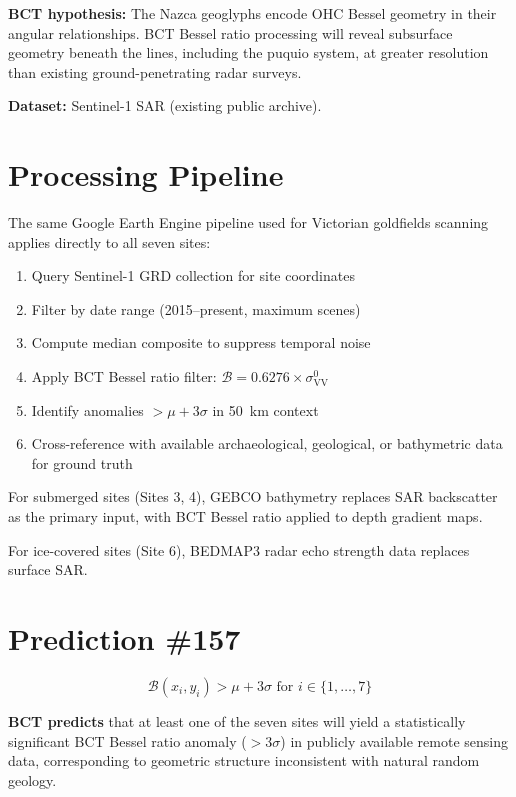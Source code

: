 \documentclass[12pt,twocolumn]{article}
\begin{document}
\textbf{BCT hypothesis:} The Nazca geoglyphs encode OHC
Bessel geometry in their angular relationships. BCT Bessel
ratio processing will reveal subsurface geometry beneath
the lines, including the puquio system, at greater
resolution than existing ground-penetrating radar surveys.

\textbf{Dataset:} Sentinel-1 SAR (existing public archive).

\section{Processing Pipeline}

The same Google Earth Engine pipeline used for Victorian
goldfields scanning~\cite{BCT_L102} applies directly to
all seven sites:

\begin{enumerate}
\item Query Sentinel-1 GRD collection for site coordinates
\item Filter by date range (2015--present, maximum scenes)
\item Compute median composite to suppress temporal noise
\item Apply BCT Bessel ratio filter:
$\mathcal{B} = 0.6276 \times \sigma^0_\mathrm{VV}$
\item Identify anomalies $> \mu + 3\sigma$ in 50~km context
\item Cross-reference with available archaeological, geological,
or bathymetric data for ground truth
\end{enumerate}

For submerged sites (Sites 3, 4), GEBCO bathymetry replaces
SAR backscatter as the primary input, with BCT Bessel ratio
applied to depth gradient maps.

For ice-covered sites (Site 6), BEDMAP3 radar echo strength
data replaces surface SAR.

\section{Prediction \#157}

\begin{equation}
\boxed{\mathcal{B}(x_i, y_i) > \mu + 3\sigma
\text{ for } i \in \{1, \ldots, 7\}}
\end{equation}

\textbf{BCT predicts} that at least one of the seven sites
will yield a statistically significant BCT Bessel ratio
anomaly ($>3\sigma$) in publicly available remote sensing
data, corresponding to geometric structure inconsistent
with natural random geology.
\end{document}
